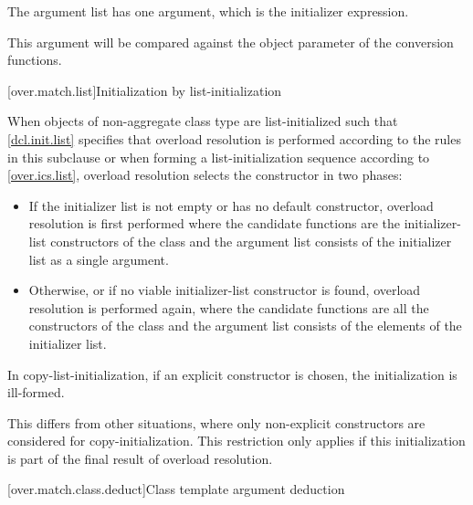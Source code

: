 \pnum
The argument list has one argument, which is the initializer expression.
\begin{note}
This argument will be compared against
the object parameter of the conversion functions.
\end{note}

[over.match.list]{Initialization by list-initialization}%

\pnum
When objects of non-aggregate class type  are
list-initialized such that \ref{dcl.init.list} specifies that overload resolution
is performed according to the rules in this subclause
or when forming a list-initialization sequence according to \ref{over.ics.list},
overload resolution selects the constructor in two phases:

\begin{itemize}
\item
If the initializer list is not empty or  has no default constructor,
overload resolution is first performed
where the candidate functions are the initializer-list constructors
of the class  and
the argument list consists of the initializer list as a single argument.

\item
Otherwise, or if no viable initializer-list constructor is found,
overload resolution is
performed again, where the candidate functions are all the constructors of
the class  and
the argument list consists of the elements of the initializer list.
\end{itemize}

In copy-list-initialization, if an explicit constructor is
chosen, the initialization is ill-formed.
\begin{note}
This differs from other situations,
where only non-explicit constructors are considered for copy-initialization.
This restriction only
applies if this initialization is part of the final result of overload
resolution.
\end{note}

[over.match.class.deduct]{Class template argument deduction}%
%

